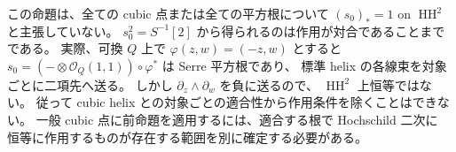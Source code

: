 \begin{remark}
\label{rem:cubic-helix-root-action}
この命題は、全ての cubic 点または全ての平方根について
$(s_0)_*=1$ on $\operatorname{HH}^2$ と主張していない。
$s_0^2=S^{-1}[2]$ から得られるのは作用が対合であることまでである。
実際、可換 $Q$ 上で $\varphi(z,w)=(-z,w)$ とすると
$s_0=(-\otimes\mathcal O_Q(1,1))\circ\varphi^*$ は Serre 平方根であり、
標準 helix の各線束を対象ごとに二項先へ送る。
しかし $\partial_z\wedge\partial_w$ を負に送るので、
$\operatorname{HH}^2$ 上恒等ではない。
従って cubic helix との対象ごとの適合性から作用条件を除くことはできない。
一般 cubic 点に前命題を適用するには、適合する根で Hochschild 二次に
恒等に作用するものが存在する範囲を別に確定する必要がある。
\end{remark}
